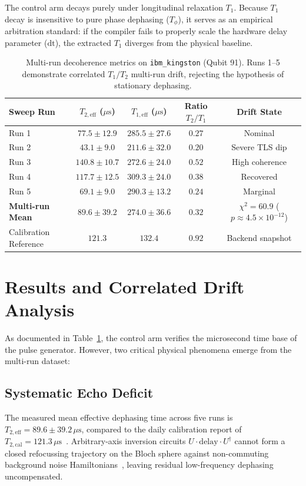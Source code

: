 \documentclass[11pt,a4paper]{article}
\begin{document}
The control arm decays purely under longitudinal relaxation $T_1$. Because $T_1$ decay is insensitive to pure phase dephasing ($T_\phi$), it serves as an empirical arbitration standard: if the compiler fails to properly scale the hardware delay parameter ($\text{dt}$), the extracted $T_1$ diverges from the physical baseline.

\begin{table}[htbp]
\centering
\begin{tabular}{lcccc}
\toprule
\textbf{Sweep Run} & \textbf{$T_{2,\text{eff}}$ ($\mu\text{s}$)} & \textbf{$T_{1,\text{eff}}$ ($\mu\text{s}$)} & \textbf{Ratio $T_2/T_1$} & \textbf{Drift State} \\
\midrule
Run 1 & $77.5 \pm 12.9$ & $285.5 \pm 27.6$ & $0.27$ & Nominal \\
Run 2 & $43.1 \pm 9.0$  & $211.6 \pm 32.0$ & $0.20$ & Severe TLS dip \\
Run 3 & $140.8 \pm 10.7$& $272.6 \pm 24.0$ & $0.52$ & High coherence \\
Run 4 & $117.7 \pm 12.5$& $309.3 \pm 24.0$ & $0.38$ & Recovered \\
Run 5 & $69.1 \pm 9.0$  & $290.3 \pm 13.2$ & $0.24$ & Marginal \\
\midrule
\textbf{Multi-run Mean} & $\mathbf{89.6 \pm 39.2}$ & $\mathbf{274.0 \pm 36.6}$ & $0.32$ & $\chi^2 = 60.9$ ($p \approx 4.5\times 10^{-12}$) \\
Calibration Reference & $121.3$ & $132.4$ & $0.92$ & Backend snapshot \\
\bottomrule
\end{tabular}
\caption{Multi-run decoherence metrics on \texttt{ibm\_kingston} (Qubit 91). Runs 1--5 demonstrate correlated $T_1/T_2$ multi-run drift, rejecting the hypothesis of stationary dephasing.}
\label{tab:qds_multirun}
\end{table}

\section{Results and Correlated Drift Analysis}
As documented in Table~\ref{tab:qds_multirun}, the control arm verifies the microsecond time base of the pulse generator. However, two critical physical phenomena emerge from the multi-run dataset:

\subsection{Systematic Echo Deficit}
The measured mean effective dephasing time across five runs is $T_{2,\text{eff}} = 89.6 \pm 39.2\,\mu\text{s}$, compared to the daily calibration report of $T_{2,\text{cal}} = 121.3\,\mu\text{s}$~\cite{krantz_guide}. Arbitrary-axis inversion circuits $U \cdot \text{delay} \cdot U^\dagger$ cannot form a closed refocussing trajectory on the Bloch sphere against non-commuting background noise Hamiltonians~\cite{viola1998dd}, leaving residual low-frequency dephasing uncompensated.
\end{document}
